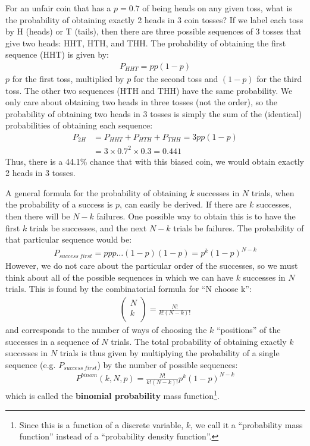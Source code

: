 \begin{example}{}{For an unfair coin that has a $p=0.7$ of being heads on any given toss, what is the probability of obtaining exactly 2 heads in 3 coin tosses?}{}
If we label each toss by H (heads) or T (tails), then there are three possible sequences of 3 tosses that give two heads: HHT, HTH, and THH. The probability of obtaining the first sequence (HHT) is given by:
\begin{align*}
P_{HHT}=pp(1-p)
\end{align*} 
$p$ for the first toss, multiplied by $p$ for the second toss and $(1-p)$ for the third toss. The other two sequences (HTH and THH) have the same probability. We only care about obtaining two heads in three tosses (not the order), so the probability of obtaining two heads in 3 tosses is simply the sum of the (identical) probabilities of obtaining each sequence:
\begin{align*}
P_{2H}&=P_{HHT}+P_{HTH}+P_{THH}=3pp(1-p)\\
&=3\times0.7^2\times0.3=0.441
\end{align*}
Thus, there is a 44.1\% chance that with this biased coin, we would obtain exactly 2 heads in 3 tosses.
\end{example}

A general formula for the probability of obtaining $k$ successes in $N$ trials, when the probability of a success is $p$, can easily be derived.  If there are $k$ successes, then there will be $N-k$ failures. One possible way to obtain this is to have the first $k$ trials be successes, and the next $N-k$ trials be failures. The probability of that particular sequence would be:
\begin{align*}
P_{success\: first}=ppp\dots(1-p)(1-p)=p^k(1-p)^{N-k}
\end{align*}
However, we do not care about the particular order of the successes, so we must think about all of the possible sequences in which we can have $k$ successes in $N$ trials. This is found by the combinatorial formula for ``N choose k'':
\begin{align*}
\left(
\begin{array}{c}
N\\
k\\
\end{array}
\right)=\frac{N!}{k!(N-k)!}
\end{align*}
and corresponds to the number of ways of choosing the $k$ ``positions'' of the successes in a sequence of $N$ trials. The total probability of obtaining exactly $k$ successes in $N$ trials is thus given by multiplying the probability of a single sequence (e.g. $P_{success\: first}$) by the number of possible sequences:
\begin{align}
\label{eqn:binomialP}
P^{binom}(k,N,p)=\frac{N!}{k!(N-k)!}p^k(1-p)^{N-k}
\end{align}
which is called the \textbf{binomial probability} mass function\footnote{Since this is a function of a discrete variable, $k$, we call it a ``probability mass function'' instead of a ``probability density function''.}.

